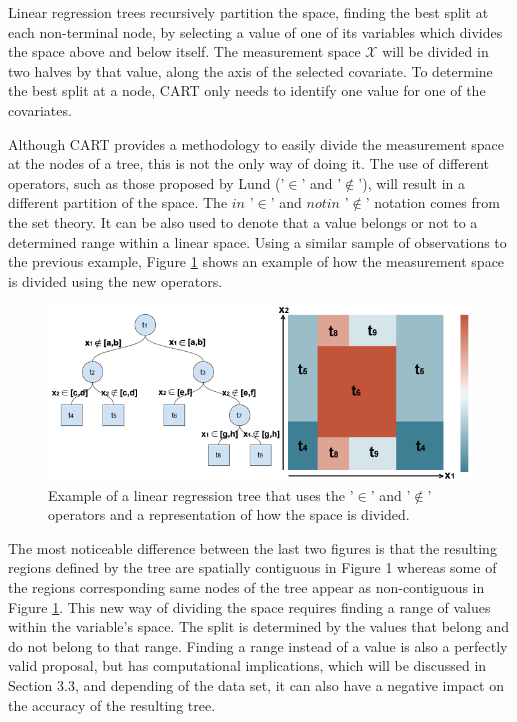 \documentclass[times,twocolumn,final,authoryear]{elsarticle}
\begin{document}
Linear regression trees recursively partition the space, finding the best split at each non-terminal node, by selecting a value of one of its variables which divides the space above and below itself. The measurement space $\mathcal{X}$ will be divided in two halves by that value, along the axis of the selected covariate. To determine the best split at a node, CART only needs to identify one value for one of the covariates.

Although CART provides a methodology to easily divide the measurement space at the nodes of a tree, this is not the only way of doing it. The use of different operators, such as those proposed by Lund ('$\in$' and '$\notin$'), will result in a different partition of the space. The $in$ '$\in$' and $not in$ '$\notin$' notation comes from the set theory. It can be also used to denote that a value belongs or not to a determined range within a linear space. Using a similar sample of observations to the previous example, Figure \ref{f2} shows an example of how the measurement space is divided using the new operators.

%
\begin{figure}
  \includegraphics[width=17cm]{fig2_master.png}
\caption{Example of a linear regression tree that uses the '$\in$' and '$\notin$' operators and a representation of how the space is divided.}
\label{f2}       %
\end{figure}
%

The most noticeable difference between the last two figures is that the resulting regions defined by the tree are spatially contiguous in Figure 1 whereas some of the regions corresponding same nodes of the tree appear as non-contiguous in Figure \ref{f2}. This new way of dividing the space requires finding a range of values within the variable’s space. The split is determined by the values that belong and do not belong to that range. Finding a range instead of a value is also a perfectly valid proposal, but has computational implications, which will be discussed in Section 3.3, and depending of the data set, it can also have a negative impact on the accuracy of the resulting tree.
\end{document}
